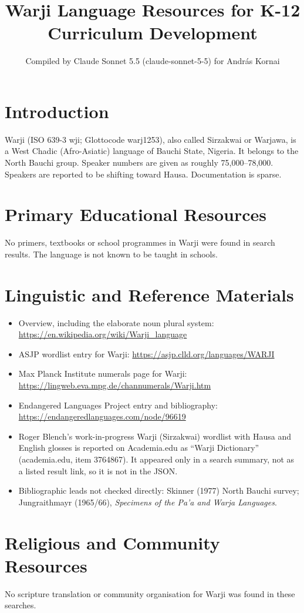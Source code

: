 \documentclass[12pt]{article}
\title{Warji Language Resources for K-12 Curriculum Development}
\author{Compiled by Claude Sonnet 5.5 (claude-sonnet-5-5) for Andr\'as Kornai}
\date{}
\begin{document}
\maketitle

\section{Introduction}
Warji (ISO 639-3 wji; Glottocode warj1253), also called Sirzakwai or Warjawa, is a West Chadic (Afro-Asiatic) language of Bauchi State, Nigeria. It belongs to the North Bauchi group. Speaker numbers are given as roughly 75,000--78,000. Speakers are reported to be shifting toward Hausa. Documentation is sparse.

\section{Primary Educational Resources}
No primers, textbooks or school programmes in Warji were found in search results. The language is not known to be taught in schools.

\section{Linguistic and Reference Materials}
\begin{itemize}
\item Overview, including the elaborate noun plural system: \url{https://en.wikipedia.org/wiki/Warji_language}
\item ASJP wordlist entry for Warji: \url{https://asjp.clld.org/languages/WARJI}
\item Max Planck Institute numerals page for Warji: \url{https://lingweb.eva.mpg.de/channumerals/Warji.htm}
\item Endangered Languages Project entry and bibliography: \url{https://endangeredlanguages.com/node/96619}
\item Roger Blench's work-in-progress Warji (Sirzakwai) wordlist with Hausa and English glosses is reported on Academia.edu as ``Warji Dictionary'' (academia.edu, item 3764867). It appeared only in a search summary, not as a listed result link, so it is not in the JSON.
\item Bibliographic leads not checked directly: Skinner (1977) North Bauchi survey; Jungraithmayr (1965/66), \emph{Specimens of the Pa'a and Warja Languages}.
\end{itemize}

\section{Religious and Community Resources}
No scripture translation or community organisation for Warji was found in these searches.
\end{document}
